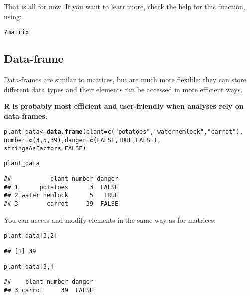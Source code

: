 \documentclass[12pt,a4paper]{scrartcl}\usepackage[]{graphicx}\usepackage[]{color}
\makeatletter
\newcommand{\hlnum}[1]{\textcolor[rgb]{0.686,0.059,0.569}{#1}}%
\newcommand{\hlstr}[1]{\textcolor[rgb]{0.192,0.494,0.8}{#1}}%
\newcommand{\hlopt}[1]{\textcolor[rgb]{0,0,0}{#1}}%
\newcommand{\hlstd}[1]{\textcolor[rgb]{0.345,0.345,0.345}{#1}}%
\newcommand{\hlkwb}[1]{\textcolor[rgb]{0.69,0.353,0.396}{#1}}%
\newcommand{\hlkwc}[1]{\textcolor[rgb]{0.333,0.667,0.333}{#1}}%
\newcommand{\hlkwd}[1]{\textcolor[rgb]{0.737,0.353,0.396}{\textbf{#1}}}%
\newenvironment{kframe}{%
 \def\at@end@of@kframe{}%
 \ifinner\ifhmode%
  \def\at@end@of@kframe{\end{minipage}}%
  \begin{minipage}{\columnwidth}%
 \fi\fi%
 \def\FrameCommand##1{\hskip\@totalleftmargin \hskip-\fboxsep
 \colorbox{shadecolor}{##1}\hskip-\fboxsep
     \hskip-\linewidth \hskip-\@totalleftmargin \hskip\columnwidth}%
 \MakeFramed {\advance\hsize-\width
   \@totalleftmargin\z@ \linewidth\hsize
   \@setminipage}}%
 {\par\unskip\endMakeFramed%
 \at@end@of@kframe}
\newenvironment{knitrout}{}{} %
\makeatother
\begin{document}
That is all for now. If you want to learn more, check the help for this function, using:
\begin{knitrout}
\color{fgcolor}\begin{kframe}
\begin{alltt}
\hlopt{?}\hlstd{matrix}
\end{alltt}
\end{kframe}
\end{knitrout}

\subsection{Data-frame}
Data-frames are similar to matrices, but are much more flexible: they can store different data types and their elements can be accessed in more efficient ways.

\textbf{R is probably most efficient and user-friendly when analyses rely on data-frames.}


\begin{knitrout}
\color{fgcolor}\begin{kframe}
\begin{alltt}
\hlstd{plant_data} \hlkwb{<-} \hlkwd{data.frame}\hlstd{(}\hlkwc{plant} \hlstd{=} \hlkwd{c}\hlstd{(}\hlstr{"potatoes"}\hlstd{,} \hlstr{"water hemlock"}\hlstd{,} \hlstr{"carrot"}\hlstd{),}
                         \hlkwc{number}\hlstd{=} \hlkwd{c}\hlstd{(}\hlnum{3}\hlstd{,}\hlnum{5}\hlstd{,}\hlnum{39}\hlstd{),} \hlkwc{danger}\hlstd{=} \hlkwd{c}\hlstd{(}\hlnum{FALSE}\hlstd{,}\hlnum{TRUE}\hlstd{,}\hlnum{FALSE}\hlstd{),}
                         \hlkwc{stringsAsFactors} \hlstd{=} \hlnum{FALSE}\hlstd{)}

\hlstd{plant_data}
\end{alltt}
\begin{verbatim}
##           plant number danger
## 1      potatoes      3  FALSE
## 2 water hemlock      5   TRUE
## 3        carrot     39  FALSE
\end{verbatim}
\end{kframe}
\end{knitrout}

You can access and modify elements in the same way as for matrices:
\begin{knitrout}
\color{fgcolor}\begin{kframe}
\begin{alltt}
\hlstd{plant_data[}\hlnum{3}\hlstd{,}\hlnum{2}\hlstd{]}
\end{alltt}
\begin{verbatim}
## [1] 39
\end{verbatim}
\begin{alltt}
\hlstd{plant_data[}\hlnum{3}\hlstd{,]}
\end{alltt}
\begin{verbatim}
##    plant number danger
## 3 carrot     39  FALSE
\end{verbatim}
\end{kframe}
\end{knitrout}
\end{document}
